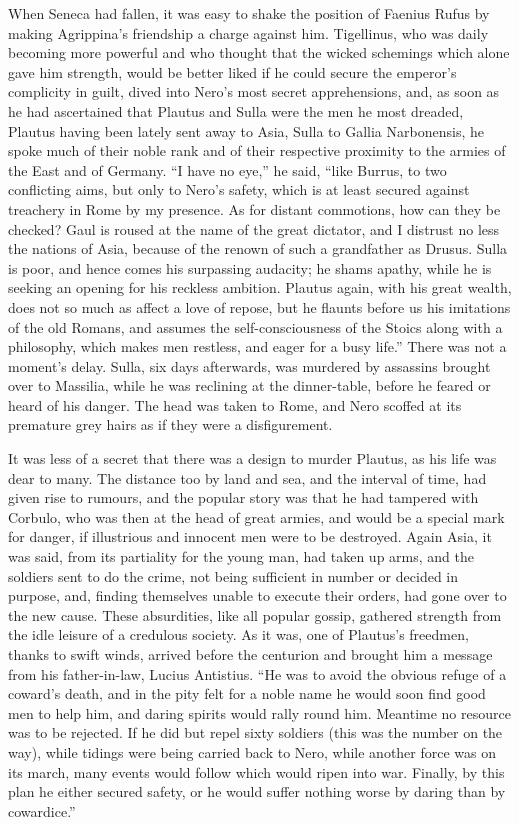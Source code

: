
When Seneca had fallen, it was easy to shake the position of Faenius Rufus by making Agrippina's friendship a charge against him. Tigellinus, who was daily becoming more powerful and who thought that the wicked schemings which alone gave him strength, would be better liked if he could secure the emperor's complicity in guilt, dived into Nero's most secret apprehensions, and, as soon as he had ascertained that Plautus and Sulla were the men he most dreaded, Plautus having been lately sent away to Asia, Sulla to Gallia Narbonensis, he spoke much of their noble rank and of their respective proximity to the armies of the East and of Germany. ``I have no eye,'' he said, ``like Burrus, to two conflicting aims, but only to Nero's safety, which is at least secured against treachery in Rome by my presence. As for distant commotions, how can they be checked? Gaul is roused at the name of the great dictator, and I distrust no less the nations of Asia, because of the renown of such a grandfather as Drusus. Sulla is poor, and hence comes his surpassing audacity; he shams apathy, while he is seeking an opening for his reckless ambition. Plautus again, with his great wealth, does not so much as affect a love of repose, but he flaunts before us his imitations of the old Romans, and assumes the self-consciousness of the Stoics along with a philosophy, which makes men restless, and eager for a busy life.'' There was not a moment's delay. Sulla, six days afterwards, was murdered by assassins brought over to Massilia, while he was reclining at the dinner-table, before he feared or heard of his danger. The head was taken to Rome, and Nero scoffed at its premature grey hairs as if they were a disfigurement.


It was less of a secret that there was a design to murder Plautus, as his life was dear to many. The distance too by land and sea, and the interval of time, had given rise to rumours, and the popular story was that he had tampered with Corbulo, who was then at the head of great armies, and would be a special mark for danger, if illustrious and innocent men were to be destroyed. Again Asia, it was said, from its partiality for the young man, had taken up arms, and the soldiers sent to do the crime, not being sufficient in number or decided in purpose, and, finding themselves unable to execute their orders, had gone over to the new cause. These absurdities, like all popular gossip, gathered strength from the idle leisure of a credulous society. As it was, one of Plautus's freedmen, thanks to swift winds, arrived before the centurion and brought him a message from his father-in-law, Lucius Antistius. ``He was to avoid the obvious refuge of a coward's death, and in the pity felt for a noble name he would soon find good men to help him, and daring spirits would rally round him. Meantime no resource was to be rejected. If he did but repel sixty soldiers (this was the number on the way), while tidings were being carried back to Nero, while another force was on its march, many events would follow which would ripen into war. Finally, by this plan he either secured safety, or he would suffer nothing worse by daring than by cowardice.''

